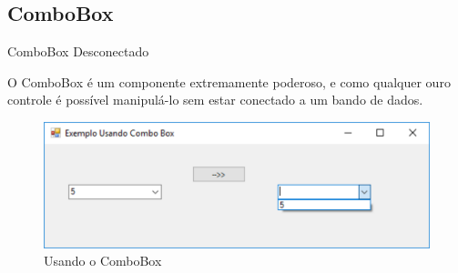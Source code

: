 
\subsection{ComboBox}

\begin{frame}


\begin{CaixaModelo01}{ComboBox Desconectado}
	
	O ComboBox é um componente extremamente poderoso, e como qualquer ouro controle é
	possível manipulá-lo sem estar conectado a um bando de dados.
	
	\begin{figure}
		\includegraphics[scale=.45]{./Figuras/F08_ComboBox01.png}
		\caption{Usando o ComboBox}
		\label{fig:ComboBox01}
	\end{figure}
	
	
\end{CaixaModelo01}

\end{frame}
